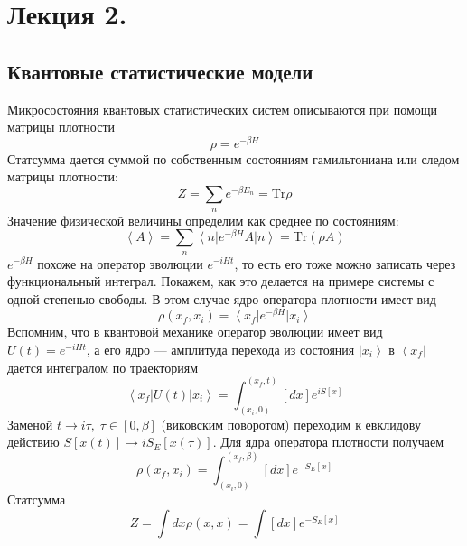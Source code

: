 \documentclass[a4paper,12pt]{article}
\theoremstyle{definition}
\theoremstyle{definition}
\theoremstyle{definition}
\begin{document}
\section{Лекция 2. }
\label{sec:lecture-2}

\subsection{Квантовые статистические модели}
\label{sec:quantum-statistical-models}

Микросостояния квантовых статистических систем описываются при помощи матрицы плотности
\begin{equation}
  \label{eq:19}
  \rho=e^{-\beta H}
\end{equation}
Статсумма дается суммой по собственным состояниям гамильтониана или следом матрицы плотности:
\begin{equation}
  \label{eq:20}
  Z=\sum_n e^{-\beta E_n}=\mathrm{Tr} \rho
\end{equation}
Значение физической величины определим как среднее по состояниям:
\begin{equation}
  \label{eq:21}
  \left< A\right>=\sum_n \left< n\right| e^{-\beta H}A\left| n \right>=\mathrm{Tr}(\rho A)
\end{equation}
$e^{-\beta H}$ похоже на оператор эволюции $e^{-i H t}$, то есть его тоже можно записать через функциональный интеграл. Покажем, как это делается на примере системы с одной степенью свободы. В этом случае ядро оператора плотности имеет вид
\begin{equation}
  \label{eq:22}
  \rho(x_f,x_i)=\left<x_f\right|e^{-\beta H} \left|x_i\right>
\end{equation}
Вспомним, что в квантовой механике оператор эволюции имеет вид $U(t)=e^{-i H t}$, а его ядро --- амплитуда перехода из состояния $\left|x_i\right>$ в $\left<x_f\right|$ дается интегралом по траекториям
\begin{equation}
  \label{eq:23}
  \left<x_f\right| U(t)\left| x_i\right>=\int_{(x_i,0)}^{(x_f,t)} [dx] e^{i S[x]}
\end{equation}
Заменой $t\to i\tau, \; \tau\in [0,\beta]$ (виковским поворотом) переходим к евклидову действию $S[x(t)]\to iS_E[x(\tau)]$. Для ядра оператора плотности получаем
\begin{equation}
  \label{eq:24}
  \rho(x_f,x_i)=\int_{(x_i,0)}^{(x_f,\beta)} [dx] e^{-S_E[x]}
\end{equation}
Статсумма
\begin{equation}
  \label{eq:25}
  Z=\int dx \rho(x,x)=\int [dx] e^{-S_E[x]}
\end{equation}
\end{document}
